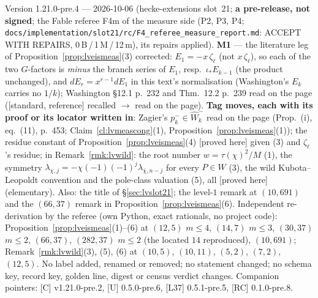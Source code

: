 \documentclass[11pt]{article}
\theoremstyle{remark}
\newcommand{\PROVED}{\textsf{[proved here]}}
\newcommand{\STD}{\textsf{[standard, reference]}}
\begin{document}
Version 1.21.0-pre.4 --- 2026-10-06 (hecke-extensions slot~21; \textbf{a pre-release, not signed}; the Fable referee F4m of the measure side (P2, P3, P4;
\texttt{docs/implementation/slot21/rc/F4\_referee\_measure\_report.md}: ACCEPT WITH REPAIRS, 0\,B\,/\,1\,M\,/\,12\,m), its repairs applied). \textbf{M1} --- the literature leg of
Proposition~\ref{prop:lveismeas}(3) corrected: $E_1=-x\,\zeta_\ell$ (not $x\,\zeta_\ell$), so each of the two $G$-factors is \emph{minus} the branch series of $E_1$, resp.\ $\iota_\ast E_{k-1}$
(the product unchanged), and $dE_r=x^{r-1}dE_1$ in this text's normalisation (Washington's $E_k$ carries no $1/k$); Washington \S12.1 p.~232 and Thm.~12.2 p.~239 read on the page
(\STD{} recalled $\to$ read on the page). \textbf{Tag moves, each with its proof or its locator written in}: Zagier's $p_k^{-}\in\hat W_k^{-}$ read on the page (Prop.~(i), eq.~(11), p.~453; Claim~\ref{cl:lvmeascong}(1),
Proposition~\ref{prop:lveismeas}(1)); the residue constant of Proposition~\ref{prop:lveismeas}(4) \PROVED{} given (3) and $\zeta_\ell$'s residue; in Remark~\ref{rmk:lvwild}: the root number
$w=\tau(\chi)^{2}/M$ (1), the symmetry $\lambda_{\chi,j}=-\chi(-1)(-1)^{j}\lambda_{\bar\chi,n-j}$ for every $P\in W$ (3), the wild Kubota--Leopoldt convention and the pole-class valuation (5),
all \PROVED{} (elementary). Also: the title of \S\ref{sec:lvslot21}; the level-$1$ remark at $(10,691)$ and the $(66,37)$ remark in Proposition~\ref{prop:lveismeas}(6). Independent
re-derivation by the referee (own Python, exact rationals, no project code): Proposition~\ref{prop:lveismeas}(1)--(6) at $(12,5)$ $m\le4$, $(14,7)$ $m\le3$, $(30,37)$ $m\le2$, $(66,37)$,
$(282,37)$ $m\le2$ (the located $14$ reproduced), $(10,691)$; Remark~\ref{rmk:lvwild}(3), (5), (6) at $(10,5)$, $(10,11)$, $(5,2)$, $(7,2)$, $(12,5)$. No label added, renamed or removed;
no statement changed; no schema key, record key, golden line, digest or census verdict changes. Companion pointers: [C] v1.21.0-pre.2, [U] 0.5.0-pre.6, [L37] 0.5.1-pre.5, [RC] 0.1.0-pre.8.
\end{document}
